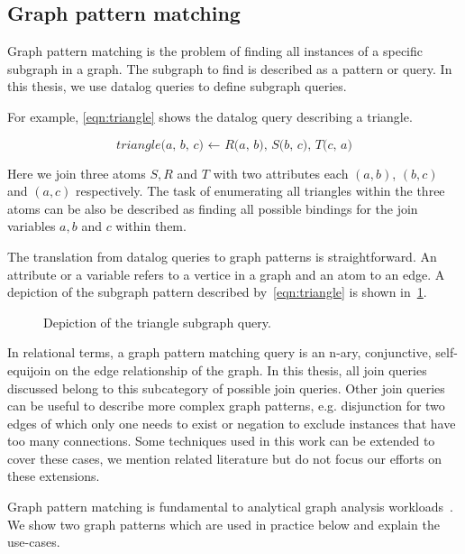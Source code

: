 \subsection{Graph pattern matching}\label{subsec:graph-pattern-matching}
Graph pattern matching is the problem of finding all instances of a specific subgraph in a graph.
The subgraph to find is described as a pattern or query.
In this thesis, we use datalog queries to define subgraph queries.

For example, \cref{eqn:triangle} shows the datalog query describing a triangle.

\begin{equation}
    \textit{triangle(a, b, c) $\leftarrow$ R(a, b), S(b, c), T(c, a)} \label{eqn:triangle}
\end{equation}

Here we join three atoms $S, R$ and $T$ with two attributes each $(a, b)$, $(b, c)$ and $(a, c)$ respectively.
The task of enumerating all triangles within the three atoms can be also be described as finding all possible
bindings for the join variables $a, b$ and $c$ within them.

The translation from datalog queries to graph patterns is straightforward.
An attribute or a variable refers to a vertice in a graph and an atom to an edge.
A depiction of the subgraph pattern described by~\cref{eqn:triangle} is shown in~\cref{fig:pattern-triangle}.

\begin{figure}
    \centering
    
    \caption{Depiction of the triangle subgraph query.}
    \label{fig:pattern-triangle}
\end{figure}

In relational terms, a graph pattern matching query is an n-ary, conjunctive, self-equijoin on the edge relationship of the graph.
In this thesis, all join queries discussed belong to this subcategory of possible join queries.
Other join queries can be useful to describe more complex graph patterns, e.g. disjunction for two edges of which only one needs to
exist or negation to exclude instances that have too many connections.
Some techniques used in this work can be extended to cover these cases, we mention related literature but do not focus
our efforts on these extensions.

Graph pattern matching is fundamental to analytical graph analysis workloads~\cite{fraud-detection,flake2002,
bodaghi2018automobile,newman2004detecting}.
We show two graph patterns which are used in practice below and explain the use-cases.

